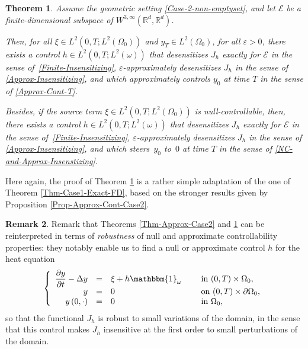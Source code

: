 \documentclass[JEP,XML,SOM,Unicode,NoFloatCountersInSection]{cedram}
\newcommand\R{{\mathbb R}}
\newtheorem{theorem}{Theorem}[section]
\theoremstyle{definition}
\newtheorem{remark}[theorem]{Remark}
\begin{document}
\begin{theorem}
\label{Thm-Case2-Exact-FD}
Assume the geometric setting \eqref{Case-2-non-emptyset}, and let $\mathcal{E}$ be a finite-dimensional subspace of $W^{3, \infty}(\R^d, \R^d)$.

Then, for all $ \xi \in L^2(0,T; L^2(\Omega_0))$ and $y_T \in L^2(\Omega_0)$, for all $\varepsilon>0$, there exists a control $h\in L^2(0,T; L^2(\omega))$ that desensitizes $J_h$ exactly for $\mathcal{E}$ in the sense of~\eqref{Finite-Insensitizing}, $\varepsilon$\nobreakdash-approximately desensitizes $J_h$ in the sense of \eqref{Approx-Insensitizing}, and which approximately controls $y_0$ at time $T$ in the sense of \eqref{Approx-Cont-T}.

Besides, if {the source term} $ \xi\!\in\!L^2(0,T; L^2(\Omega_0))$ is null-controllable, then, there exists a control $h\!\in\!L^2(0,T; L^2(\omega))$ that desensitizes $J_h$ exactly for $\mathcal{E}$ in the sense of~\eqref{Finite-Insensitizing}, $\varepsilon$-approximately desensitizes $J_h$ in the sense of \eqref{Approx-Insensitizing}, and which steers~$y_0$ to~$0$ at time $T$ in the sense of \eqref{NC-and-Approx-Insenstizing}.
\end{theorem}

Here again, the proof of Theorem \ref{Thm-Case2-Exact-FD} is a rather simple adaptation of the one of Theorem \ref{Thm-Case1-Exact-FD}, based on the stronger results given by Proposition \ref{Prop-Approx-Cont-Case2}.
\begin{remark}
Remark that Theorems \ref{Thm-Approx-Case2} and \ref{Thm-Case2-Exact-FD} can be reinterpreted in terms of \textit{robustness} of null and approximate controllability properties: they notably enable us to find a null or approximate control $h$ for the heat equation
\begin{equation*}
\left\{
\begin{array}{rcll}
\dfrac{\partial y}{\partial t}-\Delta y &=&\xi +h\mathbbm{1}_{\omega}\quad&\text{ in }(0,T) \times \Omega_0,
\\
y &=& 0 &\text{ on }(0,T) \times \partial \Omega_0,
\\
y\left(0,\cdot\right) &=& 0 &\text{ in }\Omega_0,
\end{array}
\right.
\end{equation*}
so that the functional $J_h$ is robust to small variations of the domain, in the sense that this control makes $J_h$ insensitive at the first order to small perturbations of the domain.
\end{remark}
\end{document}

